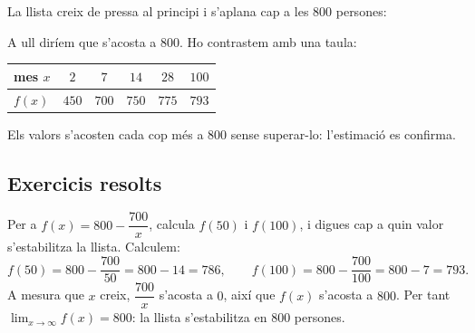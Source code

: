 \begin{exemple}
La llista creix de pressa al principi i s'aplana cap a les $800$ persones:

\begin{center}

\end{center}
\end{exemple}

\begin{exemple}
A ull diríem que s'acosta a $800$. Ho contrastem amb una taula:
\begin{center}
\begin{tabular}{lccccc}
\toprule
mes $x$ & $2$ & $7$ & $14$ & $28$ & $\num{100}$ \\
\midrule
$f(x)$ & $450$ & $700$ & $750$ & $775$ & $793$ \\
\bottomrule
\end{tabular}
\end{center}
Els valors s'acosten cada cop més a $800$ sense superar-lo: l'estimació es confirma.
\end{exemple}

\subsection{Exercicis resolts}

\begin{exresolt}
Per a $f(x)=800-\dfrac{700}{x}$, calcula $f(50)$ i $f(100)$, i digues cap a quin valor
s'estabilitza la llista.
\solucio
Calculem:
\[
f(50)=800-\frac{700}{50}=800-14=786,\qquad
f(100)=800-\frac{700}{100}=800-7=793.
\]
A mesura que $x$ creix, $\dfrac{700}{x}$ s'acosta a $0$, així que $f(x)$ s'acosta a
$800$. Per tant $\displaystyle\lim_{x\to\infty}f(x)=800$: la llista s'estabilitza en
$800$ persones.
\end{exresolt}

